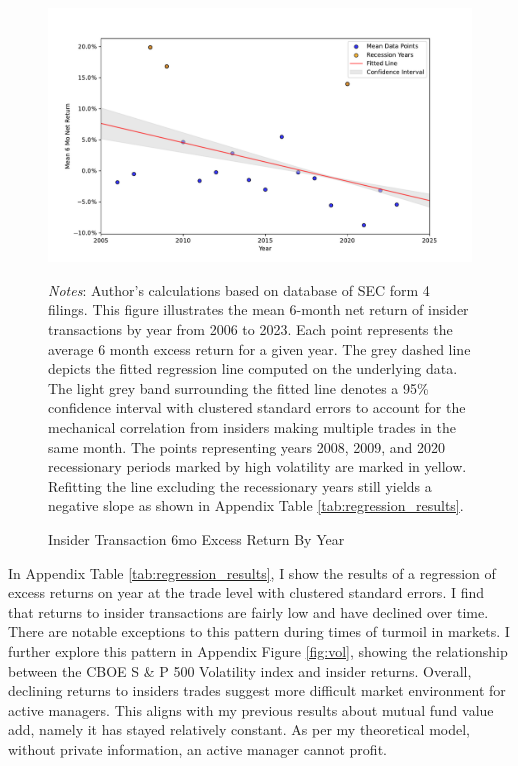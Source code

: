 \documentclass[12pt]{article}
\begin{document}
\begin{figure}[H]
    \centering
    \caption{Insider Transaction 6mo Excess Return By Year}
    \includegraphics[width=\textwidth]{insider_trades/figures/mean_excess_ret_by_year_errors_recession.pdf}
\begin{spacing}{1}
{\parbox{.95\linewidth}{
		\scriptsize{\scriptsize{{\emph{Notes}: Author's calculations based on database of SEC form 4 filings. This figure illustrates the mean 6-month net return of insider transactions by year from 2006 to 2023. Each point represents the average 6 month excess return for a given year. The grey dashed line depicts the fitted regression line computed on the underlying data. The light grey band surrounding the fitted line denotes a 95\% confidence interval with clustered standard errors to account for the mechanical correlation from insiders making multiple trades in the same month. The points representing years 2008, 2009, and 2020 recessionary periods marked by high volatility are marked in yellow. Refitting the line excluding the recessionary years still yields a negative slope as shown in Appendix Table \ref{tab:regression_results}.}}}}}
\end{spacing}
    \label{fig:mean_net_ret_by_year}
\end{figure}
In Appendix Table \ref{tab:regression_results}, I show the results of a regression of excess returns on year at the trade level with clustered standard errors. I find that returns to insider transactions are fairly low and have declined over time. There are notable exceptions to this pattern during times of turmoil in markets. I further explore this pattern in Appendix Figure \ref{fig:vol}, showing the relationship between the CBOE S \& P 500 Volatility index and insider returns. Overall, declining returns to insiders trades suggest more difficult market environment for active managers. This aligns with my previous results about mutual fund value add, namely it has stayed relatively constant. As per my theoretical model, without private information, an active manager cannot profit.
\end{document}
